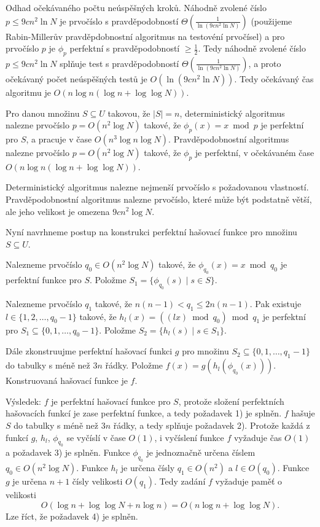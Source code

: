 \documentclass[a4paper,12pt]{article}
\begin{document}
Odhad očekávaného počtu neúspěšných kroků.\newline 
Náhodně zvolené číslo $p\le 9cn^2\ln N$ je prvočíslo s 
pravděpo\-dob\-ností $\Theta (\frac 1{\ln(9cn^2\ln N)})$ 
(použi\-je\-me Rabin-Millerův pravděpdobnostní algoritmus na testovéní prvočísel) a pro prvočíslo $
p$ je $\phi_p$ 
perfektní s prav\-dě\-po\-dob\-ností $\ge\frac 12$. Tedy náhodně zvolené 
číslo $p\le 9cn^2\ln N$ splňuje test s pravdě\-po\-dob\-ností 
$\Theta (\frac 1{\ln(9cn^2\ln N)})$, a proto očeká\-va\-ný počet neúspěšných 
testů je $O(\ln(9cn^2\ln N))$. Tedy očeká\-vaný čas 
algoritmu je $O(n\log n(\log n+\log\log N))$.

Pro danou množinu $S\subseteq U$ takovou, že 
$|S|=n$, deterministický algoritmus nalezne prvočíslo 
$p=O(n^2\log N)$ takové, že $\phi_p(x)=x\bmod p$ je perfektní 
pro $S$, a pracuje v čase $O(n^3\log n\log N)$. Pravděpodobnostní 
algoritmus nalezne pr\-vočíslo $p=O(n^2\log N)$ takové, že 
$\phi_p$ je perfektní, v očekáva\-ném čase 
$O(n\log n(\log n+\log\log N))$.
\endproclaim

Deterministický algoritmus nalezne nejmenší prvočíslo s 
po\-ža\-dovanou vlastností.  Prav\-dě\-podobnostní algoritmus 
nalezne prvočíslo, které může být podstatně 
větší, ale jeho velikost je omezena $9cn^2\log N$. 

Nyní navrhneme postup na konstrukci perfektní 
hašovací funk\-ce pro množinu $S\subseteq U$.

\roster
\item
Nalezneme prvočíslo $q_0\in O(n^2\log N)$ takové, že 
$\phi_{q_0}(x)=x\bmod q_0$ je perfektní funkce pro $S$. Položme 
$S_1=\{\phi_{q_0}(s)\mid s\in S\}$.
\item
Nalezneme prvočíslo $q_1$ takové, že 
$n(n-1)<q_1\le 2n(n-1)$. Pak existuje 
$l\in \{1,2,\dots,q_0-1\}$ takové, že $h_l(x)=((lx)\bmod q_0
)\bmod q_1$ 
je perfektní pro $S_1\subseteq \{0,1,\dots,q_0-1\}$. Položme 
$S_2=\{h_l(s)\mid s\in S_1\}$.
\item
Dále zkonstruujme perfektní hašovací funkci 
$g$ pro množinu 
$S_2\subseteq \{0,1,\dots,q_1-1\}$ do tabulky s méně než $
3n$ řádky. 
Položme $f(x)=g(h_l(\phi_{q_0}(x)))$. Konstruovaná hašovací 
funkce je $f$.
\endroster

Výsledek: $f$ je perfektní hašovací funkce pro $
S$, protože 
složení perfektních hašovacích funkcí je zase perfektní 
funkce, a tedy požadavek 1) je splněn. \newline 
$f$ hašuje $S$ do tabulky s méně než $3n$ řádky, a tedy 
splňuje požadavek 2). \newline 
Protože každá z funkcí $g$, $h_l$, $\phi_{q_0}$ se vyčíslí v čase $
O(1)$, 
i vyčíslení funkce $f$ vyžaduje čas $O(1)$ a požadavek 3) je 
splněn.\newline 
Funkce $\phi_{q_0}$ je jednoznačně určena číslem $
q_0\in O(n^2\log N)$. 
Funkce $h_l$ je určena čísly $q_1\in O(n^2)$ a $l\in O(
q_0)$. Funkce $g$ 
je určena $n+1$ čísly velikosti $O(q_1)$. Tedy zadání $
f$ 
vyžaduje paměť o velikosti 
$$O(\log n+\log\log N+n\log n)=O(n\log n+\log\log N).$$
Lze říct, že požadavek 4) je splněn. 
\end{document}

